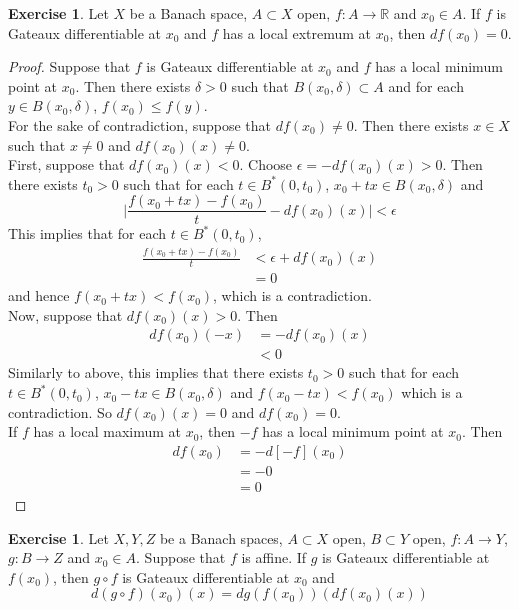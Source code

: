 \documentclass[12pt]{amsart}
\theoremstyle{definition}
\newtheorem{ex}[definition]{Exercise}
\newcommand{\del}{\delta}
\newcommand{\ep}{\epsilon}
\newcommand{\R}{\mathbb{R}}
\newcommand{\lex}[1]{\label{ex:#1}}
\begin{document}
	\begin{ex} \lex{61010}
	Let $X$ be a Banach space, $A \subset X$ open, $f:A \rightarrow \R$ and $x_0 \in A$. If $f$ is Gateaux differentiable at $x_0$ and $f$ has a local extremum at $x_0$, then $df(x_0) = 0$.
	\end{ex}	
	
	\begin{proof}
	Suppose that $f$ is Gateaux differentiable at $x_0$ and $f$ has a local minimum point at $x_0$. Then there exists $\del >0 $ such that $B(x_0, \del) \subset A$ and for each $y \in B(x_0, \del)$, $f(x_0) \leq f(y)$. \\
	For the sake of contradiction, suppose that $df(x_0) \neq 0$. Then there exists $x \in X$ such that $x \neq 0$ and $df(x_0)(x) \neq 0$. \\
	First, suppose that $df(x_0)(x) < 0$. Choose $\ep = -df(x_0)(x) >0$. Then there exists $t_0 >0$ such that for each $t \in B^*(0, t_0)$, $x_0 + tx \in B(x_0, \del)$ and $$\bigg | \frac{f(x_0 + tx) - f(x_0)}{t} - df(x_0)(x) \bigg | < \ep$$ 
	This implies that for each $t \in B^*(0, t_0)$,
	\begin{align*}
	\frac{f(x_0 + tx) - f(x_0)}{t}  
	&< \ep + df(x_0)(x) \\
	&= 0
	\end{align*} 
	and hence $f(x_0 + tx) < f(x_0)$, which is a contradiction. \\
	Now, suppose that $df(x_0)(x) > 0$. Then 
	\begin{align*}
	df(x_0)(-x) 
	&= -df(x_0)(x) \\
	& < 0
	\end{align*}
	Similarly to above, this implies that there exists $t_0 >0$ such that for each $t \in B^*(0, t_0)$, $x_0 - tx \in B(x_0, \del)$ and $f(x_0 - tx) < f(x_0)$ which is a contradiction. So $df(x_0)(x) = 0$ and $df(x_0) = 0$. \\
	If $f$ has a local maximum at $x_0$, then $-f$ has a local minimum point at $x_0$. Then 
	\begin{align*}
	df(x_0)
	&= -d[-f](x_0) \\
	&= -0 \\
	&= 0
\end{align*}	 
	\end{proof}
	
	\begin{ex} \lex{61011}
	Let $X, Y, Z$ be a Banach spaces, $A \subset X$ open, $B \subset Y$ open, $f:A \rightarrow Y$, $g:B \rightarrow Z$ and $x_0 \in A$. Suppose that $f$ is affine. If $g$ is Gateaux differentiable at $f(x_0)$, then $g \circ f$ is Gateaux differentiable at $x_0$ and $$d(g \circ f)(x_0)(x) = dg(f(x_0))(df(x_0)(x))$$
	\end{ex}
	
\end{document}
